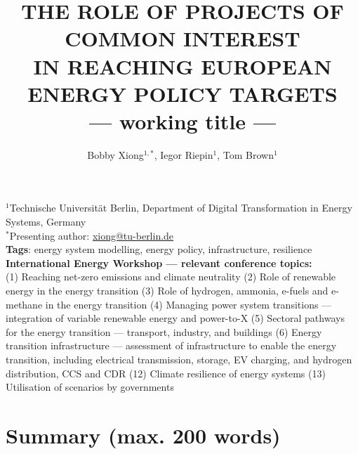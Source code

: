 \documentclass[10pt]{article}
\title{\renewcommand{\baselinestretch}{1.17}\normalsize\bf%
\uppercase{The Role of Projects of Common Interest\\in Reaching European Energy Policy Targets}\\--- working title ---
}
\author{%
Bobby Xiong$^{1,*}$, Iegor Riepin$^{1}$, Tom Brown$^{1}$\\ 
}
\date{}
\begin{document}
\maketitle

\vspace{-1cm}

\begin{center}
{\footnotesize 
$^1$Technische Universität Berlin, Department of Digital Transformation in Energy Systems, Germany \\
$^*$Presenting author: \href{mailto:xiong@tu-berlin.de}{xiong@tu-berlin.de}
}\\
\smallskip
\footnotesize
\textbf{Tags}: energy system modelling, energy policy, infrastructure, resilience \\
\medskip
\textbf{ International Energy Workshop --- relevant conference topics:}\\(1) Reaching net-zero emissions and climate neutrality \textbullet{} (2) Role of renewable energy in the energy transition \textbullet{} (3) Role of hydrogen, ammonia, e-fuels and e-methane in the energy transition \textbullet{} (4) Managing power system transitions --- integration of variable renewable energy and power-to-X \textbullet{} (5) Sectoral pathways for the energy transition --- transport, industry, and buildings \textbullet{} (6) Energy transition infrastructure --- assessment of infrastructure to enable the energy transition, including electrical transmission, storage, EV charging, and hydrogen distribution, CCS and CDR \textbullet{} (12) Climate resilience of energy systems \textbullet{} (13) Utilisation of scenarios by governments
\end{center}


\section*{Summary (max. 200 words)}
\end{document}
